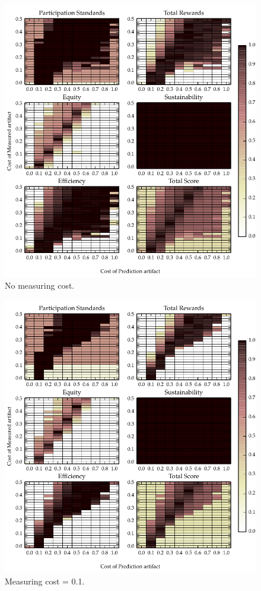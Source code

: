 \begin{figure}
\includegraphics{gfx/kc/static_0.pdf} 
\caption{No measuring cost.}
\end{figure}

\begin{figure}
\includegraphics{gfx/kc/static_1.pdf} 
\caption{Measuring cost = 0.1.}
\end{figure}

